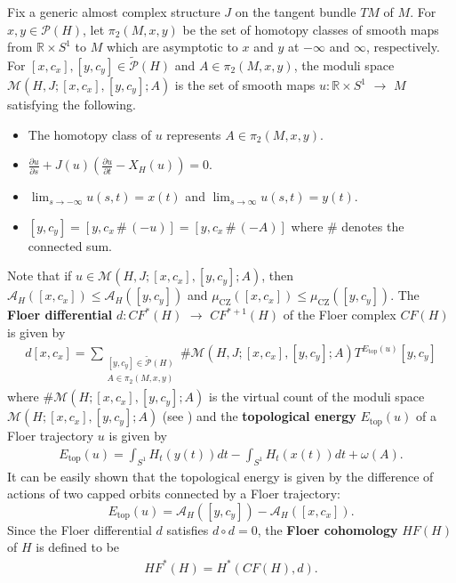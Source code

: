 \documentclass[12pt]{amsart}
\theoremstyle{definition}
\newcommand{\RR}{{\mathbb R}}
\newcommand{\lr}{{\,\,\longrightarrow\,\,}}
\begin{document}
Fix a generic almost complex structure $J$ on the tangent bundle $TM$ of $M$. For $x, y \in \mathcal{P}(H)$, let $\pi_2(M, x, y)$ be the set of homotopy classes of smooth maps from $\RR \times S^1$ to $M$ which are asymptotic to $x$ and $y$ at $-\infty$ and $\infty$, respectively. For $[x, c_x], [y, c_y] \in \widetilde{\mathcal{P}}(H)$ and $A \in \pi_2(M,x,y)$, the moduli space $\mathcal{M}(H,J; [x, c_x], [y, c_y]; A)$ is the set of smooth maps $u : \RR \times S^1 \lr M$ satisfying the following. \vspace{0.2cm}
\begin{itemize}
    \item The homotopy class of $u$ represents $A \in \pi_2(M,x, y)$.\\
    \item $\displaystyle\frac{\partial u}{\partial s} + J(u) \left( \frac{\partial u}{\partial t} - X_{H}(u) \right) = 0$.\\
    \item $\displaystyle\lim_{s \to -\infty} u(s,t) = x(t)$ and $\displaystyle\lim_{s \to \infty} u(s,t) = y(t)$.\\
    \item $[y, c_y] = [y, c_x\,\#\, (-u)] = [y, c_x\,\#\, (-A)] $ where $\#$ denotes the connected sum.\vspace{0.2cm}
\end{itemize}
Note that if $u \in \mathcal{M}(H,J; [x, c_x], [y, c_y]; A)$, then $ \mathcal{A}_H([x, c_x]) \leq \mathcal{A}_H([y,c_y])$ and $\mu_{\text{CZ}}([x, c_x]) \leq \mu_{\text{CZ}}([y, c_y])$. The \textbf{Floer differential} $d : CF^*(H) \lr CF^{*+1}(H)$ of the Floer complex $CF(H)$ is given by
\begin{align*}
    d [x, c_x] = \sum_{\substack{[y, c_y] \in \widetilde{\mathcal{P}}(H) \\ A \in \pi_2(M, x, y)}} \#\mathcal{M}(H,J ; [x, c_x], [y, c_y]; A) T^{E_{\text{top}}(u)} [y, c_y]
\end{align*}
where $\#\mathcal{M}(H ; [x, c_x], [y, c_y]; A)$ is the virtual count of the moduli space $\mathcal{M}(H ; [x, c_x], [y, c_y]; A)$ (see \cite{p}) and the \textbf{topological energy} $E_{\text{top}}(u)$ of a Floer trajectory $u$ is given by
\begin{align*}
    E_{\text{top}}(u) = \int_{S^1} H_t(y(t)) dt - \int_{S^1} H_t(x(t)) dt + \omega(A).
\end{align*}
It can be easily shown that the topological energy is given by the difference of actions of two capped orbits connected by a Floer trajectory: $$E_{\text{top}}(u) = \mathcal{A}_H([y,c_y]) - \mathcal{A}_H([x, c_x]).$$ Since the Floer differential $d$ satisfies $d \circ d = 0$, the \textbf{Floer cohomology} $HF(H)$ of $H$ is defined to be 
\begin{align*}
    HF^*(H) = H^* \left( CF(H), d \right).
\end{align*}
\end{document}
